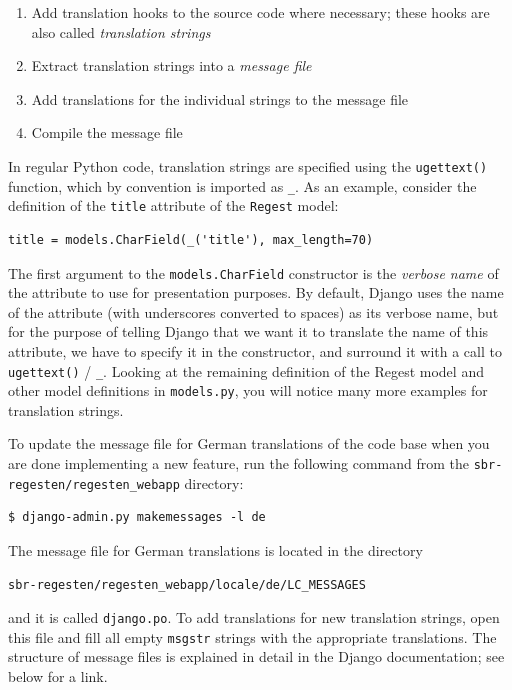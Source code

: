 \begin{enumerate}
\item Add translation hooks to the source code where necessary; these
  hooks are also called \emph{translation strings}
\item Extract translation strings into a \emph{message file}
\item Add translations for the individual strings to the message file
\item Compile the message file
\end{enumerate}

In regular Python code, translation strings are specified using the
\texttt{ugettext()} function, which by convention is imported as
\texttt{\_}. As an example, consider the definition of the
\texttt{title} attribute of the \texttt{Regest} model:

\begin{verbatim}
title = models.CharField(_('title'), max_length=70)
\end{verbatim}

The first argument to the \texttt{models.CharField} constructor is the
\emph{verbose name} of the attribute to use for presentation purposes.
By default, Django uses the name of the attribute (with underscores
converted to spaces) as its verbose name, but for the purpose of
telling Django that we want it to translate the name of this
attribute, we have to specify it in the constructor, and surround it
with a call to \texttt{ugettext()} / \texttt{\_}. Looking at the
remaining definition of the Regest model and other model definitions
in \texttt{models.py}, you will notice many more examples for
translation strings.

To update the message file for German translations of the code base
when you are done implementing a new feature, run the following
command from the \texttt{sbr-regesten/regesten\_webapp} directory:

\begin{verbatim}
$ django-admin.py makemessages -l de
\end{verbatim}

The message file for German translations is located in the directory

\begin{verbatim}
sbr-regesten/regesten_webapp/locale/de/LC_MESSAGES
\end{verbatim}

and it is called \texttt{django.po}. To add translations for new
translation strings, open this file and fill all empty \texttt{msgstr}
strings with the appropriate translations. The structure of message
files is explained in detail in the Django documentation; see below
for a link.


